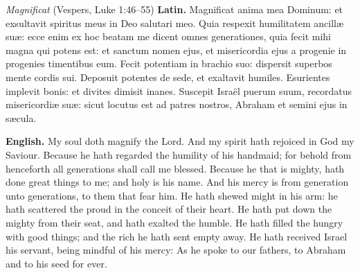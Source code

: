 \begin{massbox}{\textit{Magnificat} (Vespers, Luke 1:46--55)}
\textbf{Latin.} Magnificat anima mea Dominum: et exsultavit spiritus meus in Deo
salutari meo. Quia respexit humilitatem ancill\ae{} su\ae{}: ecce enim ex hoc
beatam me dicent omnes generationes, quia fecit mihi magna qui potens est: et
sanctum nomen ejus, et misericordia ejus a progenie in progenies timentibus
eum. Fecit potentiam in brachio suo: dispersit superbos mente cordis sui.
Deposuit potentes de sede, et exaltavit humiles. Esurientes implevit bonis: et
divites dimisit inanes. Suscepit Isra\"el puerum suum, recordatus
misericordi\ae{} su\ae{}: sicut locutus est ad patres nostros, Abraham et semini
ejus in s\ae cula.

\textbf{English.} My soul doth magnify the Lord. And my spirit hath rejoiced in
God my Saviour. Because he hath regarded the humility of his handmaid; for
behold from henceforth all generations shall call me blessed. Because he that is
mighty, hath done great things to me; and holy is his name. And his mercy is
from generation unto generations, to them that fear him. He hath shewed might in
his arm: he hath scattered the proud in the conceit of their heart. He hath put
down the mighty from their seat, and hath exalted the humble. He hath filled the
hungry with good things; and the rich he hath sent empty away. He hath received
Israel his servant, being mindful of his mercy: As he spoke to our fathers, to
Abraham and to his seed for ever.
\end{massbox}

